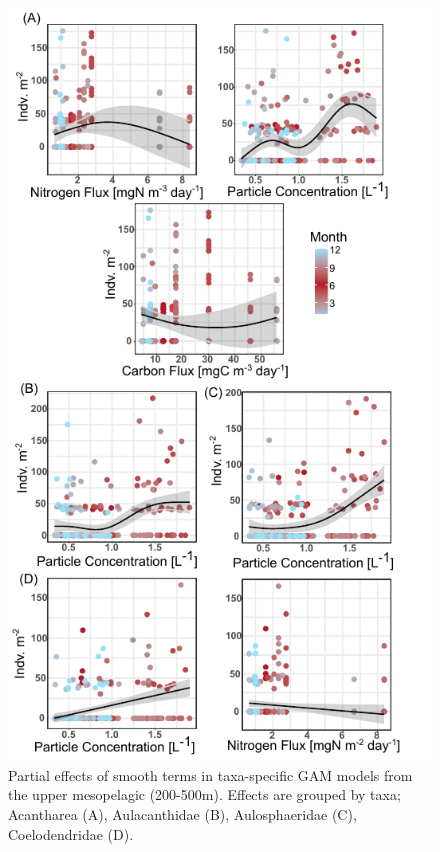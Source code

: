 \documentclass[
]{article}
\begin{document}
\begin{figure}

{\centering \includegraphics{images/07_upmeso-partial.pdf}

}

\caption{Partial effects of smooth terms in taxa-specific GAM models
from the upper mesopelagic (200-500m). Effects are grouped by taxa;
Acantharea (A), Aulacanthidae (B), Aulosphaeridae (C), Coelodendridae
(D).}

\end{figure}
\end{document}
